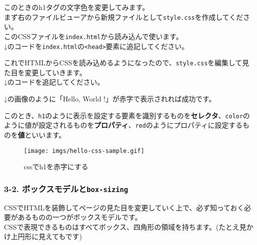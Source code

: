 このときのh1タグの文字色を変更してみます。\\
まず右のファイルビューアから新規ファイルとして\texttt{style.css}を作成してください。\\
このCSSファイルを\texttt{index.html}から読み込んで使います。\\
↓のコードを\texttt{index.html}の\texttt{\textless{}head\textgreater{}}要素に追記してください。

\begin{Shaded}
\begin{Highlighting}[]
\DataTypeTok{\textless{}}\OperatorTok{=}\OperatorTok{=}\OtherTok{ }\DataTypeTok{/\textgreater{}}
\end{Highlighting}
\end{Shaded}

これでHTMLからCSSを読み込めるようになったので、\texttt{style.css}を編集して見た目を変更していきます。\\
↓のコードを追記してください。

\begin{Shaded}
\begin{Highlighting}[]
  \NormalTok{: }\OperatorTok{;}
\NormalTok{\}}
\end{Highlighting}
\end{Shaded}

↓の画像のように「Hello, World !」が赤字で表示されれば成功です。

このとき、\texttt{h1}のように表示を設定する要素を識別するものを\textbf{セレクタ}、\texttt{color}のように値が設定されるものを\textbf{プロパティ}、\texttt{red}のようにプロパティに設定するものを\textbf{値}といいます。

\begin{figure}
\centering
\texttt{[image: imgs/hello-css-sample.gif]}
\caption{cssでh1を赤字にする}
\end{figure}

\subsubsection{\texorpdfstring{3-2.
ボックスモデルと\texttt{box-sizing}}{3-2. ボックスモデルとbox-sizing}}\label{ux30dcux30c3ux30afux30b9ux30e2ux30c7ux30ebux3068box-sizing}

CSSでHTMLを装飾してページの見た目を変更していく上で、必ず知っておく必要があるものの一つがボックスモデルです。\\
CSSで表現できるものはすべてボックス、四角形の領域を持ちます。(たとえ見かけ上円形に見えてもです)

